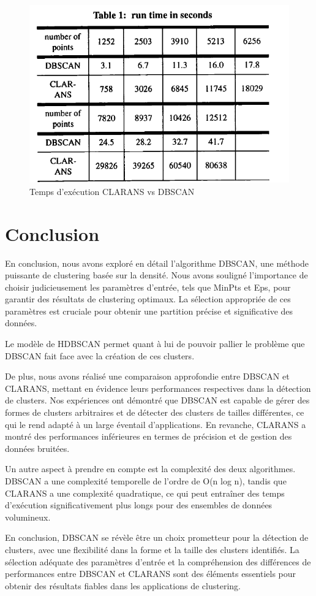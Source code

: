 \documentclass[
  oneside]{memoire-umons}
\begin{document}
\begin{figure}
\centering
\includegraphics{src/memoire-umons/images/clarans_vs_dbscan.png}
\caption{Temps d'exécution CLARANS vs DBSCAN \label{time}}
\end{figure}

\chapter{Conclusion}

En conclusion, nous avons exploré en détail l'algorithme DBSCAN, une
méthode puissante de clustering basée sur la densité. Nous avons
souligné l'importance de choisir judicieusement les paramètres d'entrée,
tels que MinPts et Eps, pour garantir des résultats de clustering
optimaux. La sélection appropriée de ces paramètres est cruciale pour
obtenir une partition précise et significative des données.

Le modèle de HDBSCAN permet quant à lui de pouvoir pallier le problème
que DBSCAN fait face avec la création de ces clusters.

De plus, nous avons réalisé une comparaison approfondie entre DBSCAN et
CLARANS, mettant en évidence leurs performances respectives dans la
détection de clusters. Nos expériences ont démontré que DBSCAN est
capable de gérer des formes de clusters arbitraires et de détecter des
clusters de tailles différentes, ce qui le rend adapté à un large
éventail d'applications. En revanche, CLARANS a montré des performances
inférieures en termes de précision et de gestion des données bruitées.

Un autre aspect à prendre en compte est la complexité des deux
algorithmes. DBSCAN a une complexité temporelle de l'ordre de O(n log
n), tandis que CLARANS a une complexité quadratique, ce qui peut
entraîner des temps d'exécution significativement plus longs pour des
ensembles de données volumineux.

En conclusion, DBSCAN se révèle être un choix prometteur pour la
détection de clusters, avec une flexibilité dans la forme et la taille
des clusters identifiés. La sélection adéquate des paramètres d'entrée
et la compréhension des différences de performances entre DBSCAN et
CLARANS sont des éléments essentiels pour obtenir des résultats fiables
dans les applications de clustering.

\printbibliography[title=Bibliographie]
\end{document}
